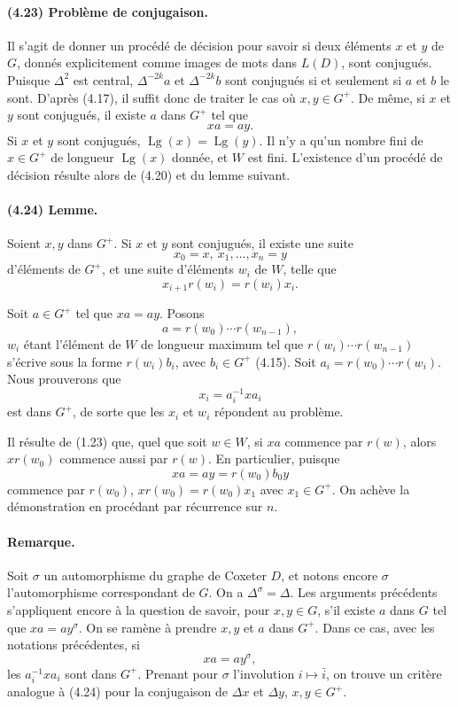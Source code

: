 \documentclass[10pt]{article}
\begin{document}
\paragraph{(4.23) Problème de conjugaison.} Il s'agit de donner un procédé de décision pour savoir si deux éléments \(x\) et \(y\) de \(G\), donnés explicitement comme images de mots dans \(L(D)\), sont conjugués. Puisque \(\Delta^2\) est central, \(\Delta^{-2k}a\) et \(\Delta^{-2k}b\) sont conjugués si et seulement si \(a\) et \(b\) le sont. D'après (4.17), il suffit donc de traiter le cas où \(x,y\in G^+\). De même, si \(x\) et \(y\) sont conjugués, il existe \(a\) dans \(G^+\) tel que
\[
xa=ay.
\]
Si \(x\) et \(y\) sont conjugués, \(\operatorname{Lg}(x)=\operatorname{Lg}(y)\). Il n'y a qu'un nombre fini de \(x\in G^+\) de longueur \(\operatorname{Lg}(x)\) donnée, et \(W\) est fini. L'existence d'un procédé de décision résulte alors de (4.20) et du lemme suivant.

\paragraph{(4.24) Lemme.} Soient \(x,y\) dans \(G^+\). Si \(x\) et \(y\) sont conjugués, il existe une suite
\[
x_0=x,\ x_1,\ldots,x_n=y
\]
d'éléments de \(G^+\), et une suite d'éléments \(w_i\) de \(W\), telle que
\[
x_{i+1}r(w_i)=r(w_i)x_i.
\]

Soit \(a\in G^+\) tel que \(xa=ay\). Posons
\[
a=r(w_0)\cdots r(w_{n-1}),
\]
\(w_i\) étant l'élément de \(W\) de longueur maximum tel que \(r(w_i)\cdots r(w_{n-1})\) s'écrive sous la forme \(r(w_i)b_i\), avec \(b_i\in G^+\) (4.15). Soit \(a_i=r(w_0)\cdots r(w_i)\). Nous prouverons que
\[
x_i=a_i^{-1}xa_i
\]
est dans \(G^+\), de sorte que les \(x_i\) et \(w_i\) répondent au problème.

Il résulte de (1.23) que, quel que soit \(w\in W\), si \(xa\) commence par \(r(w)\), alors \(xr(w_0)\) commence aussi par \(r(w)\). En particulier, puisque
\[
xa=ay=r(w_0)b_0y
\]
commence par \(r(w_0)\), \(xr(w_0)=r(w_0)x_1\) avec \(x_1\in G^+\). On achève la démonstration en procédant par récurrence sur \(n\).

\paragraph{Remarque.} Soit \(\sigma\) un automorphisme du graphe de Coxeter \(D\), et notons encore \(\sigma\) l'automorphisme correspondant de \(G\). On a \(\Delta^\sigma=\Delta\). Les arguments précédents s'appliquent encore à la question de savoir, pour \(x,y\in G\), s'il existe \(a\) dans \(G\) tel que \(xa=ay^\sigma\). On se ramène à prendre \(x,y\) et \(a\) dans \(G^+\). Dans ce cas, avec les notations précédentes, si
\[
xa=ay^\sigma,
\]
les \(a_i^{-1}xa_i\) sont dans \(G^+\). Prenant pour \(\sigma\) l'involution \(i\mapsto\bar i\), on trouve un critère analogue à (4.24) pour la conjugaison de \(\Delta x\) et \(\Delta y\), \(x,y\in G^+\).
\end{document}
